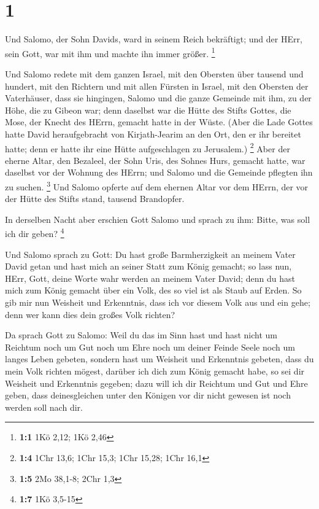 \hypertarget{section}{%
\section{1}\label{section}}

 Und Salomo, der Sohn Davids, ward in seinem Reich
bekräftigt; und der HErr, sein Gott, war mit ihm und machte ihn immer
größer. \footnote{\textbf{1:1} 1Kö 2,12; 1Kö 2,46}

 Und Salomo redete mit dem ganzen Israel, mit den Obersten
über tausend und hundert, mit den Richtern und mit allen Fürsten in
Israel, mit den Obersten der Vaterhäuser,  dass sie
hingingen, Salomo und die ganze Gemeinde mit ihm, zu der Höhe, die zu
Gibeon war; denn daselbst war die Hütte des Stifts Gottes, die Mose, der
Knecht des HErrn, gemacht hatte in der Wüste.  (Aber die
Lade Gottes hatte David heraufgebracht von Kirjath-Jearim an den Ort,
den er ihr bereitet hatte; denn er hatte ihr eine Hütte aufgeschlagen zu
Jerusalem.) \footnote{\textbf{1:4} 1Chr 13,6; 1Chr 15,3; 1Chr 15,28;
  1Chr 16,1}  Aber der eherne Altar, den Bezaleel, der Sohn
Uris, des Sohnes Hurs, gemacht hatte, war daselbst vor der Wohnung des
HErrn; und Salomo und die Gemeinde pflegten ihn zu suchen. \footnote{\textbf{1:5}
  2Mo 38,1-8; 2Chr 1,3}  Und Salomo opferte auf dem ehernen
Altar vor dem HErrn, der vor der Hütte des Stifts stand, tausend
Brandopfer.

 In derselben Nacht aber erschien Gott Salomo und sprach zu
ihm: Bitte, was soll ich dir geben? \footnote{\textbf{1:7} 1Kö 3,5-15}

 Und Salomo sprach zu Gott: Du hast große Barmherzigkeit an
meinem Vater David getan und hast mich an seiner Statt zum König
gemacht;  so lass nun, HErr, Gott, deine Worte wahr werden
an meinem Vater David; denn du hast mich zum König gemacht über ein
Volk, des so viel ist als Staub auf Erden.  So gib mir nun
Weisheit und Erkenntnis, dass ich vor diesem Volk aus und ein gehe; denn
wer kann dies dein großes Volk richten?

 Da sprach Gott zu Salomo: Weil du das im Sinn hast und
hast nicht um Reichtum noch um Gut noch um Ehre noch um deiner Feinde
Seele noch um langes Leben gebeten, sondern hast um Weisheit und
Erkenntnis gebeten, dass du mein Volk richten mögest, darüber ich dich
zum König gemacht habe,  so sei dir Weisheit und Erkenntnis
gegeben; dazu will ich dir Reichtum und Gut und Ehre geben, dass
deinesgleichen unter den Königen vor dir nicht gewesen ist noch werden
soll nach dir.


